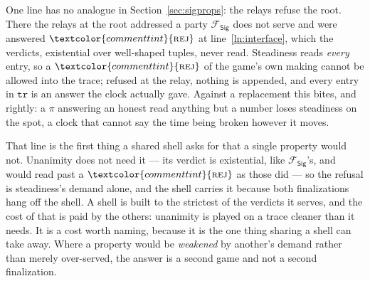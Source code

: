\documentclass[10pt,oneside,openany]{book}
\newcommand{\op}[1]{\textnormal{\textsc{#1}}}
\newcommand{\atom}[1]{\textcolor{commenttint}{\op{#1}}}
\newcommand{\rej}{\atom{rej}}
\newcommand{\Fsig}{\mathcal{F}_{\mathsf{Sig}}}
\newcommand{\V}[1]{\mathtt{#1}}
\theoremstyle{accentdef}
\theoremstyle{accentplain}
\begin{document}
One line has no analogue in Section~\ref{sec:sigprops}: the relays refuse the root. There the
relays at the root addressed a party $\Fsig$ does not serve and were answered $\rej$ at
line~\ref{ln:interface}, which the verdicts, existential over well-shaped tuples, never read.
Steadiness reads \emph{every} entry, so a $\rej$ of the game's own making cannot be allowed into
the trace; refused at the relay, nothing is appended, and every entry in $\V{tr}$ is an answer the
clock actually gave. Against a replacement this bites, and rightly: a $\pi$ answering an honest
read anything but a number loses steadiness on the spot, a clock that cannot say the time being
broken however it moves.

That line is the first thing a shared shell asks for that a single property would not. Unanimity
does not need it --- its verdict is existential, like $\Fsig$'s, and would read past a $\rej$ as
those did --- so the refusal is steadiness's demand alone, and the shell carries it because both
finalizations hang off the shell. A shell is built to the strictest of the verdicts it serves, and
the cost of that is paid by the others: unanimity is played on a trace cleaner than it needs. It
is a cost worth naming, because it is the one thing sharing a shell can take away. Where a
property would be \emph{weakened} by another's demand rather than merely over-served, the answer
is a second game and not a second finalization.
\end{document}
